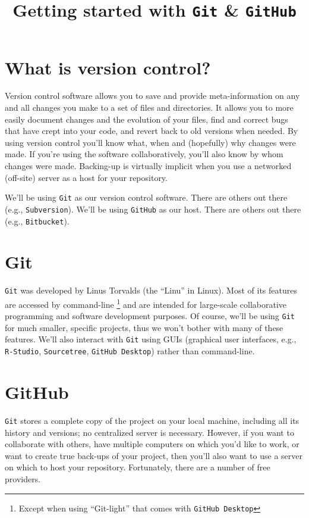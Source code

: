 \documentclass[12pt,letterpaper]{article}
\author{}
\title{Getting started with \texttt{Git} \& \texttt{GitHub}}
\date{}
\begin{document}
\maketitle

\tableofcontents

\pagebreak


\section{What is version control?}
Version control software allows you to save and provide meta-information on any and all changes you make to a set of files and directories.
It allows you to more easily document changes and the evolution of your files, 
find and correct bugs that have crept into your code, 
and revert back to old versions when needed.
By using version control you'll know what, 
when and (hopefully) why changes were made.
If you're using the software collaboratively, 
you'll also know by whom changes were made.
Backing-up is virtually implicit when you use a networked (off-site) server as a 
host for your repository.

We'll be using \texttt{Git} as our version control software.
There are others out there (e.g., \texttt{Subversion}).
We'll be using \texttt{GitHub} as our host.
There are others out there (e.g., \texttt{Bitbucket}).

\section{Git}
\texttt{Git} was developed by Linus Torvalds (the ``Linu'' in Linux).
Most of its features are accessed by command-line
\unskip
\footnote{
Except when using ``Git-light'' that comes with \texttt{GitHub Desktop}}
and are intended for large-scale collaborative programming and software development purposes.
Of course, we'll be using \texttt{Git} for much smaller, specific projects, thus we 
won't bother with many of these features.
We'll also interact with \texttt{Git} using GUIs (graphical user interfaces, e.g., \texttt{R-Studio}, \texttt{Sourcetree}, \texttt{GitHub Desktop}) rather than command-line.


\section{GitHub}
\texttt{Git} stores a complete copy of the project on your local machine, 
including all its history and versions; 
no centralized server is necessary.
However, if you want to collaborate with others, 
have multiple computers on which you'd like to work, 
or want to create true back-ups of your project, 
then you'll also want to use a server on which to host your repository.
Fortunately, there are a number of free providers.
\end{document}
